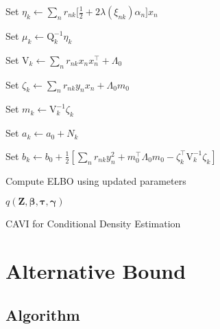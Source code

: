 \documentclass[twoside,11pt]{article}
\newcommand{\transpose}[1]{#1^{\intercal}}
\newcommand{\nsum}{\sum_{n}}
\newcommand{\boldbeta}{\boldsymbol\beta}
\newcommand{\boldgamma}{\boldsymbol\gamma}
\newcommand{\boldtau}{\boldsymbol\tau}
\begin{document}
\begin{algorithm}[H]
{{   Set $\eta_k \leftarrow \sum_{n} r_{nk} \big[ \frac{1}{2} + 2\lambda(\xi_{nk}) \alpha_n \big]x_n$\; %
         
   Set $\mu_k \leftarrow \mathrm{Q}_k^{-1} \eta_k$\; %
   
   Set $\mathrm{V}_k \leftarrow \nsum r_{nk} x_n \transpose{x_n} + \Lambda_0$ \; %
   
   Set $\zeta_k \leftarrow \sum_{n} r_{nk} y_n x_n + \Lambda_0 m_0$\; %
   
   Set $m_k \leftarrow \mathrm{V}_k^{-1} \zeta_k$\; %
   
   Set $a_k \leftarrow a_0 + N_k$\; %
   
   Set $b_k \leftarrow b_0 + \frac{1}{2}[\nsum r_{nk} y_n^2 + \transpose{m_0}\Lambda_0 m_0 - \transpose{\zeta_k} \mathrm{V}_k^{-1} \zeta_k]$\; %
   }
   Compute ELBO using updated parameters
 } %
 \Return $q \left( \mathbf{Z}, \boldbeta, \boldtau, \boldgamma \right)$
 \caption{CAVI for Conditional Density Estimation}
\end{algorithm}



\section{Alternative Bound}


\newpage

\subsection{Algorithm}
\end{document}

